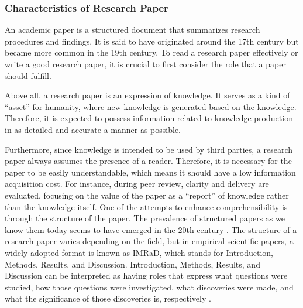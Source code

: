 \documentclass{book}
\begin{document}

\subsubsection{Characteristics of Research Paper}
An academic paper is a structured document that summarizes research procedures and findings. It is said to have originated around the 17th century but became more common in the 19th century. To read a research paper effectively or write a good research paper, it is crucial to first consider the role that a paper should fulfill. 

Above all, a research paper is an expression of knowledge. It serves as a kind of ``asset'' for humanity, where new knowledge is generated based on the knowledge. Therefore, it is expected to possess information related to knowledge production in as detailed and accurate a manner as possible.

Furthermore, since knowledge is intended to be used by third parties, a research paper always assumes the presence of a reader. Therefore, it is necessary for the paper to be easily understandable, which means it should have a low information acquisition cost. For instance, during peer review, clarity and delivery are evaluated, focusing on the value of the paper as a ``report'' of knowledge rather than the knowledge itself. One of the attempts to enhance comprehensibility is through the structure of the paper. The prevalence of structured papers as we know them today seems to have emerged in the 20th century \cite{harmon1989structure}. 
The structure of a research paper varies depending on the field, but in empirical scientific papers, a widely adopted format is known as IMRaD, which stands for Introduction, Methods, Results, and Discussion. Introduction, Methods, Results, and Discussion can be interpreted as having roles that express what questions were studied, how those questions were investigated, what discoveries were made, and what the significance of those discoveries is, respectively \cite{gastel2022write}.
\end{document}
